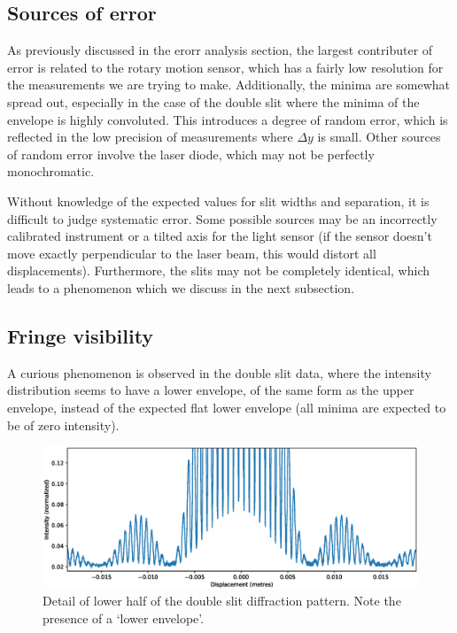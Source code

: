 \documentclass[11pt]{article}
\begin{document}
        \subsection{Sources of error}
        As previously discussed in the erorr analysis section, the largest contributer of error is related to the rotary motion sensor,
        which has a fairly low resolution for the measurements we are trying to make.
        Additionally, the minima are somewhat spread out, especially in the case of the double slit where the
        minima of the envelope is highly convoluted.
        This introduces a degree of random error, which is reflected in the low precision of measurements where $\Delta y$ is small.
        Other sources of random error involve the laser diode, which may not be perfectly monochromatic.

        Without knowledge of the expected values for slit widths and separation, it is difficult to judge systematic error.
        Some possible sources may be an incorrectly calibrated instrument or a tilted axis for the light sensor (if the sensor doesn't
        move exactly perpendicular to the laser beam, this would distort all displacements).
        Furthermore, the slits may not be completely identical, which leads to a phenomenon which we discuss in the next subsection.

        \subsection{Fringe visibility}
        A curious phenomenon is observed in the double slit data, where the intensity distribution seems to have a lower envelope,
        of the same form as the upper envelope, instead of the expected flat lower envelope (all minima are expected to be of zero intensity).
        \begin{figure}[H]
                \centering
                \includegraphics[width=\textwidth]{Slit4_lower.eps}
                \caption{Detail of lower half of the double slit diffraction pattern. Note the presence of a `lower envelope'.}
                \label{fig:double_lower}
        \end{figure}
\end{document}
